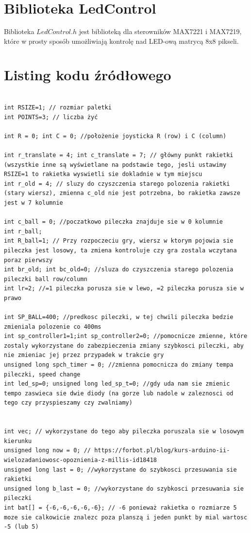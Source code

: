 \documentclass[12pt,notitlepage]{article}
\begin{document}
\section{Biblioteka LedControl}
Biblioteka $LedControl.h$ jest biblioteką dla sterowników MAX7221 i MAX7219, które w prosty sposób umożliwiają kontrolę nad LED-ową matrycą 8x8 pikseli.
\newpage
\section{Listing kodu źródłowego}

\begin{lstlisting}[style=CStyle]

int RSIZE=1; // rozmiar paletki
int POINTS=3; // liczba żyć

int R = 0; int C = 0; //położenie joysticka R (row) i C (column)

int r_translate = 4; int c_translate = 7; // główny punkt rakietki (wszystkie inne są wyświetlane na podstawie tego, jesli ustawimy RSIZE=1 to rakietka wyswietli sie dokladnie w tym miejscu
int r_old = 4; // sluzy do czyszczenia starego polozenia rakietki (stary wiersz), zmienna c_old nie jest potrzebna, bo rakietka zawsze jest w 7 kolumnie

int c_ball = 0; //poczatkowo pileczka znajduje sie w 0 kolumnie
int r_ball; 
int R_ball=1; // Przy rozpoczeciu gry, wiersz w ktorym pojowia sie pileczka jest losowy, ta zmiena kontroluje czy gra zostala wczytana poraz pierwszy 
int br_old; int bc_old=0; //sluza do czyszczenia starego polozenia pileczki ball row/column
int lr=2; //=1 pileczka porusza sie w lewo, =2 pileczka porusza sie w prawo

int SP_BALL=400; //predkosc pileczki, w tej chwili pileczka bedzie zmieniala polozenie co 400ms
int sp_controller1=1;int sp_controller2=0; //pomocnicze zmienne, które zostaly wykorzystane do zabezpieczenia zmiany szybkosci pileczki, aby nie zmieniac jej przez przypadek w trakcie gry
unsigned long spch_timer = 0; //zmienna pomocnicza do zmiany tempa pileczki, speed change
int led_sp=0; unsigned long led_sp_t=0; //gdy uda nam sie zmienic tempo zaswieca sie dwie diody (na gorze lub nadole w zaleznosci od tego czy przyspieszamy czy zwalniamy)


int vec; // wykorzystane do tego aby pileczka poruszala sie w losowym kierunku
unsigned long now = 0; // https://forbot.pl/blog/kurs-arduino-ii-wielozadaniowosc-opoznienia-z-millis-id18418
unsigned long last = 0; //wykorzystane do szybkosci przesuwania sie rakietki
unsigned long b_last = 0; //wykorzystane do szybkosci przesuwania sie pileczki
int bat[] = {-6,-6,-6,-6,-6}; // -6 ponieważ rakietka o rozmiarze 5 moze sie calkowicie znalezc poza planszą i jeden punkt by mial wartosc -5 (lub 5)


\end{lstlisting}
\end{document}
